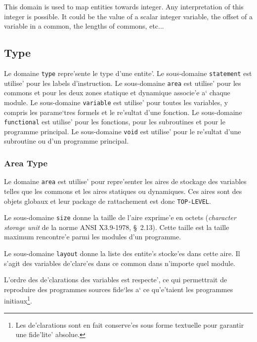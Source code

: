 
This domain is used to map entities towards integer. Any interpretation
of this integer is possible. It could be the value of a scalar integer
variable, the offset of a variable in a common, the lengths of commons, etc...

\subsection{Type}
\label{subsection-type}


Le domaine \verb/type/ repre'sente le type d'une entite'.  Le
sous-domaine \verb/statement/ est utilise' pour les labels
d'instruction.  Le sous-domaine \verb/area/ est utilise' pour les
commons et pour les deux zones statique et dynamique associe'e a` chaque
module.  Le sous-domaine \verb/variable/ est utilise' pour toutes les
variables, y compris les parame`tres formels et le re'sultat d'une
fonction.  Le sous-domaine \verb/functional/ est utilise' pour les
fonctions, pour les subroutines et pour le programme principal.  Le
sous-domaine \verb/void/ est utilise' pour le re'sultat d'une subroutine
ou d'un programme principal.

\subsubsection{Area Type}
\label{subsubsection-area}


Le domaine {\tt area} est utilise' pour repre'senter les aires de
stockage des variables telles que les commons et les aires statiques ou
dynamiques. Ces aires sont des objets globaux et leur package de
rattachement est donc \verb/TOP-LEVEL/.

Le sous-domaine {\tt size} donne la taille de l'aire
exprime'e en octets ({\em character storage unit} de la norme ANSI
X3.9-1978, \S~2.13). Cette taille est la taille maximum rencontre'e
parmi les modules d'un programme. 

Le sous-domaine {\tt layout} donne la
liste des entite's stocke'es dans cette aire. Il s'agit des variables
de'clare'es dans ce common dans n'importe quel module.

L'ordre des de'clarations des variables est respecte', ce qui
permettrait de reproduire des programmes sources fide`les a` ce
qu'e'taient les programmes initiaux\footnote{Les de'clarations sont en
fait conserve'es sous forme textuelle pour garantir une fide'lite'
absolue.}.

